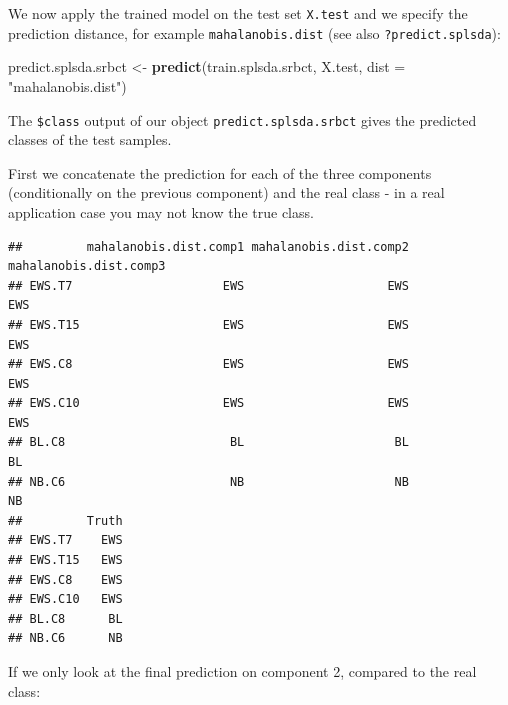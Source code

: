 \documentclass[]{book}
\newenvironment{Shaded}{\begin{snugshade}}{\end{snugshade}}
\newcommand{\KeywordTok}[1]{\textcolor[rgb]{0.13,0.29,0.53}{\textbf{#1}}}
\newcommand{\DataTypeTok}[1]{\textcolor[rgb]{0.13,0.29,0.53}{#1}}
\newcommand{\DecValTok}[1]{\textcolor[rgb]{0.00,0.00,0.81}{#1}}
\newcommand{\StringTok}[1]{\textcolor[rgb]{0.31,0.60,0.02}{#1}}
\newcommand{\CommentTok}[1]{\textcolor[rgb]{0.56,0.35,0.01}{\textit{#1}}}
\newcommand{\OperatorTok}[1]{\textcolor[rgb]{0.81,0.36,0.00}{\textbf{#1}}}
\newcommand{\NormalTok}[1]{#1}
\begin{document}
We now apply the trained model on the test set \texttt{X.test} and we
specify the prediction distance, for example \texttt{mahalanobis.dist}
(see also \texttt{?predict.splsda}):

\begin{Shaded}
\begin{Highlighting}[]
\NormalTok{predict.splsda.srbct <-}\StringTok{ }\KeywordTok{predict}\NormalTok{(train.splsda.srbct, X.test, }
                                \DataTypeTok{dist =} \StringTok{"mahalanobis.dist"}\NormalTok{)}
\end{Highlighting}
\end{Shaded}

The \texttt{\$class} output of our object \texttt{predict.splsda.srbct}
gives the predicted classes of the test samples.

First we concatenate the prediction for each of the three components
(conditionally on the previous component) and the real class - in a real
application case you may not know the true class.

\begin{Shaded}
\end{Shaded}

\begin{verbatim}
##         mahalanobis.dist.comp1 mahalanobis.dist.comp2 mahalanobis.dist.comp3
## EWS.T7                     EWS                    EWS                    EWS
## EWS.T15                    EWS                    EWS                    EWS
## EWS.C8                     EWS                    EWS                    EWS
## EWS.C10                    EWS                    EWS                    EWS
## BL.C8                       BL                     BL                     BL
## NB.C6                       NB                     NB                     NB
##         Truth
## EWS.T7    EWS
## EWS.T15   EWS
## EWS.C8    EWS
## EWS.C10   EWS
## BL.C8      BL
## NB.C6      NB
\end{verbatim}

If we only look at the final prediction on component 2, compared to the
real class:

\begin{Shaded}
\end{Shaded}
\end{document}
